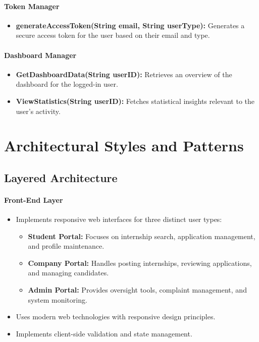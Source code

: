 \paragraph{Token Manager}
\begin{itemize}
    \item \textbf{generateAccessToken(String email, String userType):} Generates a secure access token for the user based on their email and type.
\end{itemize}

\paragraph{Dashboard Manager}
\begin{itemize}
    \item \textbf{GetDashboardData(String userID):} Retrieves an overview of the dashboard for the logged-in user.
    \item \textbf{ViewStatistics(String userID):} Fetches statistical insights relevant to the user’s activity.
\end{itemize}

\section{Architectural Styles and Patterns}
\label{subsec:architectural_styles_patterns}

\subsection{Layered Architecture}
\paragraph{Front-End Layer}
\begin{itemize}
    \item Implements responsive web interfaces for three distinct user types:
    \begin{itemize}
        \item \textbf{Student Portal:} Focuses on internship search, application management, and profile maintenance.
        \item \textbf{Company Portal:} Handles posting internships, reviewing applications, and managing candidates.
        \item \textbf{Admin Portal:} Provides oversight tools, complaint management, and system monitoring.
    \end{itemize}
    \item Uses modern web technologies with responsive design principles.
    \item Implements client-side validation and state management.
\end{itemize}

